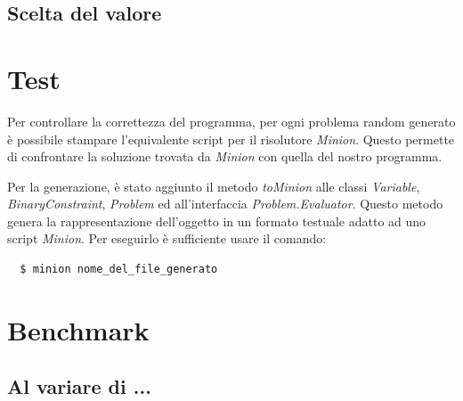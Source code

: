 \documentclass[a4paper,12pt,italian]{article}
\begin{document}
\subsection{Scelta del valore}

\section{Test}

Per controllare la correttezza del programma, per ogni problema random
generato \`e possibile stampare l'equivalente script per il risolutore
\textit{Minion}. Questo permette di confrontare la soluzione trovata
da \textit{Minion} con quella del nostro programma.

Per la generazione, \`e stato aggiunto il metodo \textit{toMinion}
alle classi \textit{Variable}, \textit{BinaryConstraint},
\textit{Problem} ed all'interfaccia \textit{Problem.Evaluator}. Questo
metodo genera la rappresentazione dell'oggetto in un formato testuale
adatto ad uno script \textit{Minion}. Per eseguirlo \`e sufficiente
usare il comando:

\begin{verbatim}
  $ minion nome_del_file_generato
\end{verbatim}

\section{Benchmark}

\subsection{Al variare di ...}
\end{document}
